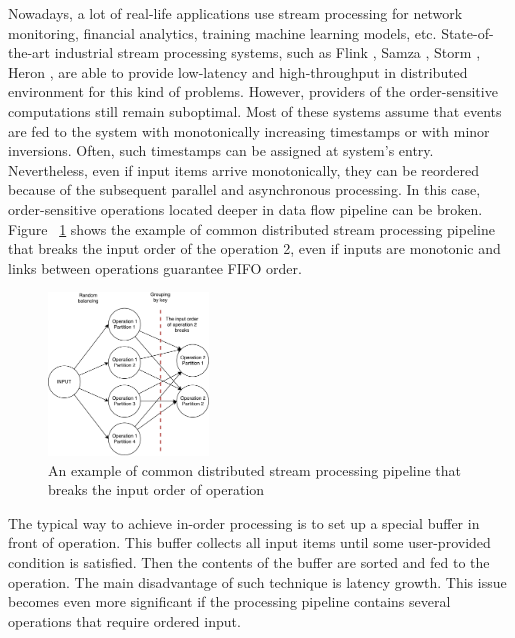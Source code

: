 
\label {fs-intro}

Nowadays, a lot of real-life applications use stream processing for network monitoring, financial analytics, training machine learning models, etc. State-of-the-art industrial stream processing systems, such as Flink \cite{carbone2015apache}, Samza \cite{Noghabi:2017:SSS:3137765.3137770}, Storm \cite{apache:storm}, Heron \cite{Kulkarni:2015:THS:2723372.2742788}, are able to provide low-latency and high-throughput in distributed environment for this kind of problems. However, providers of the order-sensitive computations still remain suboptimal. Most of these systems assume that events are fed to the system with monotonically increasing timestamps or with minor inversions. Often, such timestamps can be assigned at system's entry. Nevertheless, even if input items arrive monotonically, they can be reordered because of the subsequent parallel and asynchronous processing. In this case, order-sensitive operations located deeper in data flow pipeline can be broken. Figure ~\ref{break-order-dataflow} shows the example of common distributed stream processing pipeline that breaks the input order of the operation 2, even if inputs are monotonic and links between operations guarantee FIFO order.

\begin{figure}[htbp]
  \centering
  \includegraphics[width=0.38\textwidth]{pics/break_order_pipeline}
  \caption{An  example of common distributed stream processing pipeline that breaks the input order of operation}
  \label {break-order-dataflow}
\end{figure}

The typical way to achieve in-order processing is to set up a special buffer in front of operation. This buffer collects all input items until some user-provided condition is satisfied. Then the contents of the buffer are sorted and fed to the operation. The main disadvantage of such technique is latency growth. This issue becomes even more significant if the processing pipeline contains several operations that require ordered input. 

